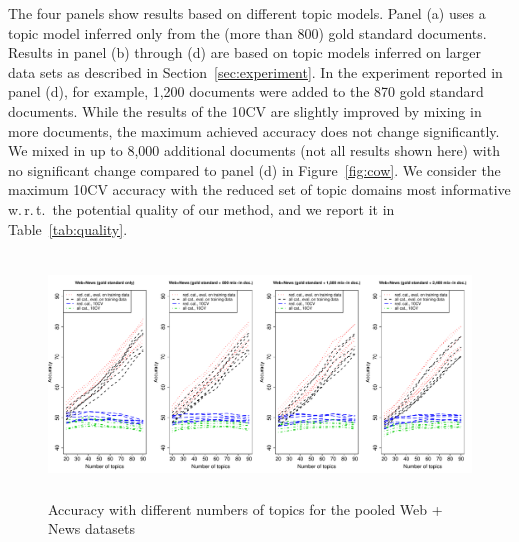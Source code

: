 \documentclass[11pt]{article}
\begin{document}
The four panels show results based on different topic models.
Panel (a) uses a topic model inferred only from the (more than 800) gold standard documents.
Results in panel (b) through (d) are based on topic models inferred on larger data sets as described in Section~\ref{sec:experiment}.
In the experiment reported in panel (d), for example, 1,200 documents were added to the 870 gold standard documents.
While the results of the 10CV are slightly improved by mixing in more documents, the maximum achieved accuracy does not change significantly.
We mixed in up to 8,000 additional documents (not all results shown here) with no significant change compared to panel (d) in Figure~\ref{fig:cow}.
We consider the maximum 10CV accuracy with the reduced set of topic domains most informative w.\,r.\,t.\ the potential quality of our method, and we report it in Table~\ref{tab:quality}.


\begin{figure}[!ht]
  \centering
  \includegraphics[width=\textwidth, height=6.4cm]{graphics/coreko.pdf}
  \caption{Accuracy with different numbers of topics for the pooled Web + News datasets}
  \label{fig:coreko}
\end{figure}
\end{document}
